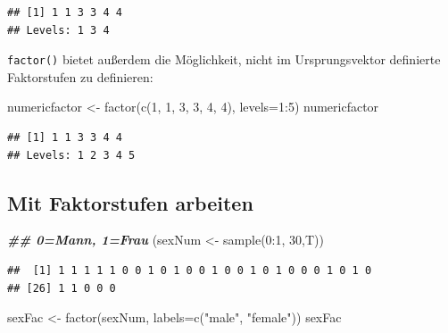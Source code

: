 \documentclass[
]{book}
\newenvironment{Shaded}{\begin{snugshade}}{\end{snugshade}}
\newcommand{\AttributeTok}[1]{\textcolor[rgb]{0.77,0.63,0.00}{#1}}
\newcommand{\DecValTok}[1]{\textcolor[rgb]{0.00,0.00,0.81}{#1}}
\newcommand{\DocumentationTok}[1]{\textcolor[rgb]{0.56,0.35,0.01}{\textbf{\textit{#1}}}}
\newcommand{\FunctionTok}[1]{\textcolor[rgb]{0.00,0.00,0.00}{#1}}
\newcommand{\NormalTok}[1]{#1}
\newcommand{\OtherTok}[1]{\textcolor[rgb]{0.56,0.35,0.01}{#1}}
\newcommand{\SpecialCharTok}[1]{\textcolor[rgb]{0.00,0.00,0.00}{#1}}
\newcommand{\StringTok}[1]{\textcolor[rgb]{0.31,0.60,0.02}{#1}}
\begin{document}
\begin{verbatim}
## [1] 1 1 3 3 4 4
## Levels: 1 3 4
\end{verbatim}

\texttt{factor()} bietet außerdem die Möglichkeit, nicht im Ursprungsvektor definierte Faktorstufen zu definieren:

\begin{Shaded}
\begin{Highlighting}[]
\NormalTok{numericfactor }\OtherTok{\textless{}{-}} \FunctionTok{factor}\NormalTok{(}\FunctionTok{c}\NormalTok{(}\DecValTok{1}\NormalTok{, }\DecValTok{1}\NormalTok{, }\DecValTok{3}\NormalTok{, }\DecValTok{3}\NormalTok{, }\DecValTok{4}\NormalTok{, }\DecValTok{4}\NormalTok{), }\AttributeTok{levels=}\DecValTok{1}\SpecialCharTok{:}\DecValTok{5}\NormalTok{)}
\NormalTok{numericfactor}
\end{Highlighting}
\end{Shaded}

\begin{verbatim}
## [1] 1 1 3 3 4 4
## Levels: 1 2 3 4 5
\end{verbatim}

\hypertarget{mit-faktorstufen-arbeiten}{%
\subsection{Mit Faktorstufen arbeiten}\label{mit-faktorstufen-arbeiten}}

\begin{Shaded}
\begin{Highlighting}[]
\DocumentationTok{\#\# 0=Mann, 1=Frau}
\NormalTok{(sexNum }\OtherTok{\textless{}{-}} \FunctionTok{sample}\NormalTok{(}\DecValTok{0}\SpecialCharTok{:}\DecValTok{1}\NormalTok{, }\DecValTok{30}\NormalTok{,T)) }
\end{Highlighting}
\end{Shaded}

\begin{verbatim}
##  [1] 1 1 1 1 1 0 0 1 0 1 0 0 1 0 0 1 0 1 0 0 0 1 0 1 0
## [26] 1 1 0 0 0
\end{verbatim}

\begin{Shaded}
\begin{Highlighting}[]
\NormalTok{sexFac }\OtherTok{\textless{}{-}} \FunctionTok{factor}\NormalTok{(sexNum, }\AttributeTok{labels=}\FunctionTok{c}\NormalTok{(}\StringTok{"male"}\NormalTok{, }\StringTok{"female"}\NormalTok{))}
\NormalTok{sexFac}
\end{Highlighting}
\end{Shaded}
\end{document}
